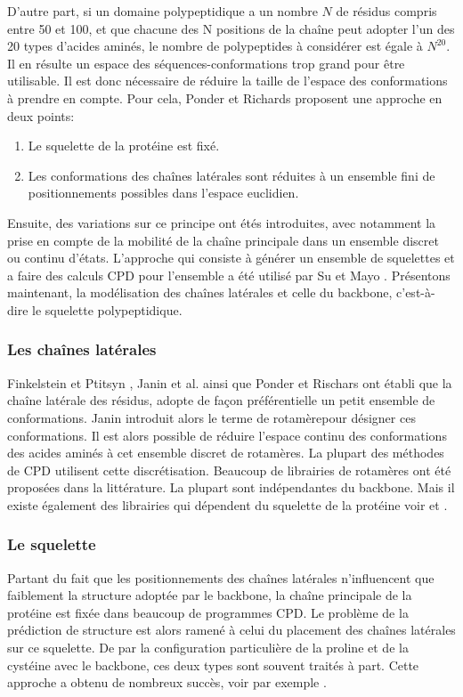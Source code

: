 D'autre part, si un domaine polypeptidique a un nombre $N$ de résidus compris entre 50 et 100, et que chacune des N positions de la chaîne peut adopter l'un des 20 types d'acides aminés, le nombre de polypeptides à considérer est égale à  $N^{20}$. Il en résulte un espace des séquences-conformations trop grand pour être utilisable. Il est donc nécessaire de réduire la taille de l'espace des conformations à prendre en compte. Pour cela, Ponder et Richards \cite{Ponder87} proposent une approche en deux points:
\begin{enumerate}
\item Le squelette de la protéine est fixé.
\item Les conformations des chaînes latérales sont réduites à un ensemble fini de positionnements possibles dans l'espace euclidien.
\end{enumerate}  
Ensuite, des variations sur ce principe ont étés introduites, avec notamment la prise en compte de la mobilité de la chaîne principale dans un ensemble discret ou continu d'états. L'approche qui consiste à générer un ensemble de squelettes et a faire des calculs CPD pour l'ensemble a été utilisé par Su et Mayo \cite{Su97}. 
Présentons maintenant, la modélisation des chaînes latérales et celle du backbone, c'est-à-dire le squelette polypeptidique.

\subsubsection{Les chaînes latérales}

Finkelstein et Ptitsyn \cite{Finkelstein77}, Janin et al. \cite{Janin78} ainsi que Ponder et Rischars \cite{Ponder87} ont établi que la chaîne latérale des résidus, adopte de façon préférentielle un petit ensemble de conformations. Janin introduit alors le terme de \og rotamère\fg pour désigner ces conformations. Il est alors possible de réduire l'espace continu des conformations des acides aminés à cet ensemble discret de rotamères. La plupart des méthodes de CPD utilisent cette discrétisation. Beaucoup de librairies de rotamères ont été proposées dans la littérature. La plupart sont indépendantes du backbone. Mais il existe également des librairies qui dépendent du squelette de la protéine voir \cite{McGregor87} et \cite{Dunbrack93}. 

\subsubsection{Le squelette}
Partant du fait que les positionnements des chaînes latérales n'influencent que faiblement la structure adoptée par le backbone, la chaîne principale de la protéine est fixée dans beaucoup de programmes CPD. Le problème de la prédiction de structure est alors ramené à celui du placement des chaînes latérales sur ce squelette. De par la configuration particulière de la proline et de la cystéine avec le backbone, ces deux types sont souvent traités à part. Cette approche a obtenu de nombreux succès, voir par exemple \cite{Dahiyat97b}.

